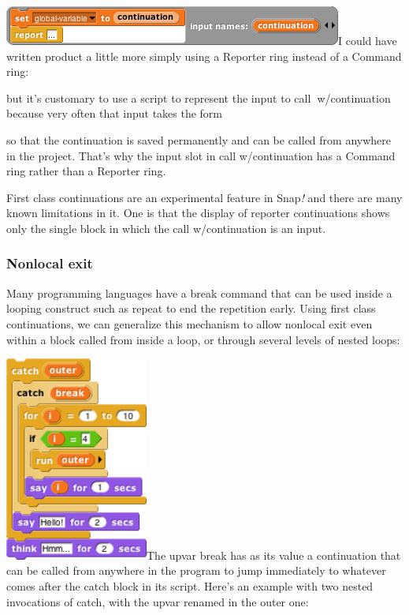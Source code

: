\includegraphics[width=4.38542in,height=0.51042in]{media/image918.png}I
could have written product a little more simply using a Reporter ring
instead of a Command ring:

but it's customary to use a script to represent the input to
call\textbf{~}w/continuation because very often that input takes the
form

so that the continuation is saved permanently and can be called from
anywhere in the project. That's why the input slot in call
w/continuation has a Command ring rather than a Reporter ring.

First class continuations are an experimental feature in Snap\emph{!}
and there are many known limitations in it. One is that the display of
reporter continuations shows only the single block in which the call
w/continuation is an input.

\subsubsection{\texorpdfstring{\hfill\break
Nonlocal exit}{ Nonlocal exit}}\label{nonlocal-exit}

Many programming languages have a break command that can be used inside
a looping construct such as repeat to end the repetition early. Using
first class continuations, we can generalize this mechanism to allow
nonlocal exit even within a block called from inside a loop, or through
several levels of nested loops:

\includegraphics[width=1.85417in,height=2.65347in]{media/image923.png}The
upvar break has as its value a continuation that can be called from
anywhere in the program to jump immediately to whatever comes after the
catch block in its script. Here's an example with two nested invocations
of catch, with the upvar renamed in the outer one:

